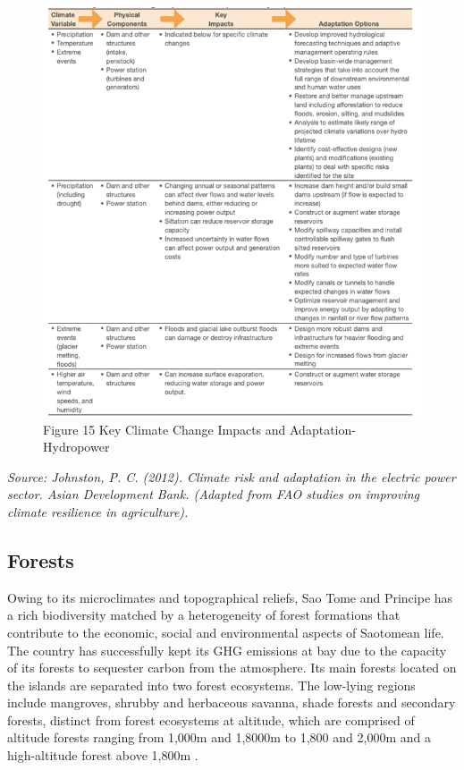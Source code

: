 \documentclass[
]{book}
\begin{document}
\begin{figure}
\centering
\includegraphics{images/ccimpacts_hydropower.png}
\caption{Figure 15 Key Climate Change Impacts and Adaptation- Hydropower}
\end{figure}

\emph{Source: Johnston, P. C. (2012). Climate risk and adaptation in the electric power sector. Asian Development Bank. (Adapted from FAO studies on improving climate resilience in agriculture).}

\hypertarget{forests-1}{%
\subsection{Forests}\label{forests-1}}

Owing to its microclimates and topographical reliefs, Sao Tome and Principe has a rich biodiversity matched by a heterogeneity of forest formations that contribute to the economic, social and environmental aspects of Saotomean life. The country has successfully kept its GHG emissions at bay due to the capacity of its forests to sequester carbon from the atmosphere. Its main forests located on the islands are separated into two forest ecosystems. The low-lying regions include mangroves, shrubby and herbaceous savanna, shade forests and secondary forests, distinct from forest ecosystems at altitude, which are comprised of altitude forests ranging from 1,000m and 1,8000m to 1,800 and 2,000m and a high-altitude forest above 1,800m .
\end{document}
